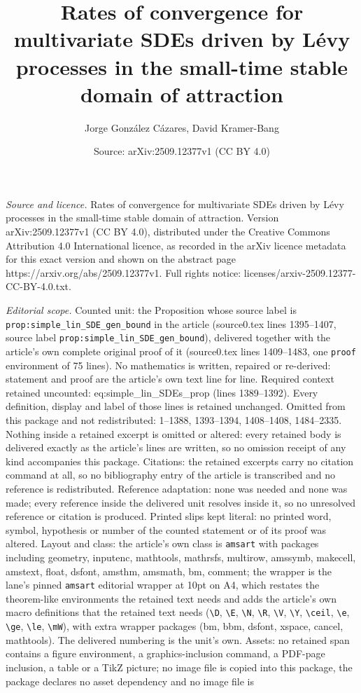 \documentclass[10pt,a4paper]{amsart}
\title[Rates of convergence for multivariate SDEs driven by L\'evy ]{Rates of convergence for multivariate SDEs driven by L\'evy processes in the small-time stable domain of attraction}
\author{Jorge Gonz\'alez C\'azares, David Kramer-Bang}
\date{Source: arXiv:2509.12377v1 (CC BY 4.0)}
\begin{document}
\maketitle

\noindent\emph{Source and licence.} Rates of convergence for multivariate SDEs driven by L\'evy processes in the small-time stable domain of attraction. Version arXiv:2509.12377v1 (CC BY 4.0), distributed under the Creative Commons Attribution 4.0 International licence, as recorded in the arXiv licence metadata for this exact version and shown on the abstract page https://arxiv.org/abs/2509.12377v1. Full rights notice: licenses/arxiv-2509.12377-CC-BY-4.0.txt.\par\smallskip

\noindent\textit{Editorial scope.} Counted unit: the Proposition whose source label is \texttt{prop:simple\_lin\_SDE\_gen\_bound} in the article (source0.tex lines 1395--1407, source label \texttt{prop:simple\_lin\_SDE\_gen\_bound}), delivered together with the article's own complete original proof of it (source0.tex lines 1409--1483, one \texttt{proof} environment of 75 lines). No mathematics is written, repaired or re-derived: statement and proof are the article's own text line for line. Required context retained uncounted: eq:simple\_lin\_SDEs\_prop (lines 1389--1392). Every definition, display and label of those lines is retained unchanged. Omitted from this package and not redistributed: 1--1388, 1393--1394, 1408--1408, 1484--2335. Nothing inside a retained excerpt is omitted or altered: every retained body is delivered exactly as the article's lines are written, so no omission receipt of any kind accompanies this package. Citations: the retained excerpts carry no citation command at all, so no bibliography entry of the article is transcribed and no reference is redistributed. Reference adaptation: none was needed and none was made; every reference inside the delivered unit resolves inside it, so no unresolved reference or citation is produced. Printed slips kept literal: no printed word, symbol, hypothesis or number of the counted statement or of its proof was altered. Layout and class: the article's own class is \texttt{amsart} with packages including geometry, inputenc, mathtools, mathrsfs, multirow, amssymb, makecell, amstext, float, dsfont, amsthm, amsmath, bm, comment; the wrapper is the lane's pinned \texttt{amsart} editorial wrapper at 10pt on A4, which restates the theorem-like environments the retained text needs and adds the article's own macro definitions that the retained text needs (\texttt{\textbackslash D}, \texttt{\textbackslash E}, \texttt{\textbackslash N}, \texttt{\textbackslash R}, \texttt{\textbackslash V}, \texttt{\textbackslash Y}, \texttt{\textbackslash ceil}, \texttt{\textbackslash e}, \texttt{\textbackslash ge}, \texttt{\textbackslash le}, \texttt{\textbackslash mW}), with extra wrapper packages (bm, bbm, dsfont, xspace, cancel, mathtools). The delivered numbering is the unit's own. Assets: no retained span contains a figure environment, a graphics-inclusion command, a PDF-page inclusion, a table or a TikZ picture; no image file is copied into this package, the package declares no asset dependency and no image file is 
\end{document}
